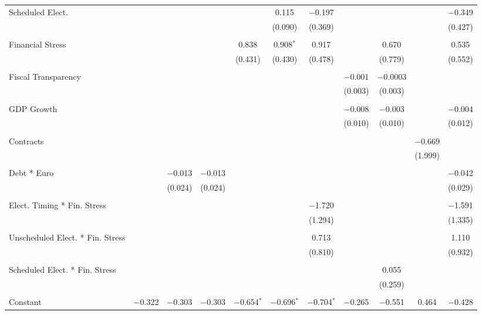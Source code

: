 \begin{table}[!htbp]
\begin{tabular}{@{\extracolsep{5pt}}lcccccccccc}
 Scheduled Elect. &  &  &  &  & 0.115 & $-$0.197 &  &  &  & $-$0.349 \\ 
  &  &  &  &  & (0.090) & (0.369) &  &  &  & (0.427) \\ 
  & & & & & & & & & & \\ 
 Financial Stress &  &  &  & 0.838 & 0.908$^{*}$ & 0.917 &  & 0.670 &  & 0.535 \\ 
  &  &  &  & (0.431) & (0.430) & (0.478) &  & (0.779) &  & (0.552) \\ 
  & & & & & & & & & & \\ 
 Fiscal Transparency &  &  &  &  &  &  & $-$0.001 & $-$0.0003 &  &  \\ 
  &  &  &  &  &  &  & (0.003) & (0.003) &  &  \\ 
  & & & & & & & & & & \\ 
 GDP Growth &  &  &  &  &  &  & $-$0.008 & $-$0.003 &  & $-$0.004 \\ 
  &  &  &  &  &  &  & (0.010) & (0.010) &  & (0.012) \\ 
  & & & & & & & & & & \\ 
 Contracts &  &  &  &  &  &  &  &  & $-$0.669 &  \\ 
  &  &  &  &  &  &  &  &  & (1.999) &  \\ 
  & & & & & & & & & & \\ 
 Debt * Euro &  & $-$0.013 & $-$0.013 &  &  &  &  &  &  & $-$0.042 \\ 
  &  & (0.024) & (0.024) &  &  &  &  &  &  & (0.029) \\ 
  & & & & & & & & & & \\ 
 Elect. Timing * Fin. Stress &  &  &  &  &  & $-$1.720 &  &  &  & $-$1.591 \\ 
  &  &  &  &  &  & (1.294) &  &  &  & (1.335) \\ 
  & & & & & & & & & & \\ 
 Unscheduled Elect. * Fin. Stress &  &  &  &  &  & 0.713 &  &  &  & 1.110 \\ 
  &  &  &  &  &  & (0.810) &  &  &  & (0.932) \\ 
  & & & & & & & & & & \\ 
 Scheduled Elect. * Fin. Stress &  &  &  &  &  &  &  & 0.055 &  &  \\ 
  &  &  &  &  &  &  &  & (0.259) &  &  \\ 
  & & & & & & & & & & \\ 
 Constant & $-$0.322 & $-$0.303 & $-$0.303 & $-$0.654$^{*}$ & $-$0.696$^{*}$ & $-$0.704$^{*}$ & $-$0.265 & $-$0.551 & 0.464 & $-$0.428 \\ 

\end{tabular}
\end{table}
